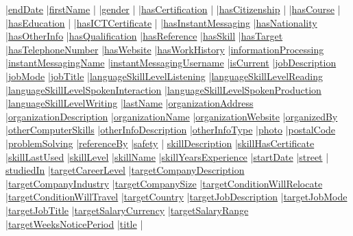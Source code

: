 \documentclass[a4paper,12pt]{article}
\numberwithin{equation}{section}
\begin{document}
|\hyperlink{endDate}{endDate} 
|\hyperlink{firstName}{firstName} |
|\hyperlink{gender}{gender} |
|\hyperlink{hasCertification}{hasCertification} |
|\hyperlink{hasCitizenship}{hasCitizenship} |
|\hyperlink{hasCourse}{hasCourse} |
|\hyperlink{hasEducation}{hasEducation} |
|\hyperlink{hasICTCertificate}{hasICTCertificate} |
|\hyperlink{hasInstantMessaging}{hasInstantMessaging} |\hyperlink{hasNationality}{hasNationality} |\hyperlink{hasOtherInfo}{hasOtherInfo} |\hyperlink{hasQualification}{hasQualification} |\hyperlink{hasReference}{hasReference} |\hyperlink{hasSkill}{hasSkill} |\hyperlink{hasTarget}{hasTarget} |\hyperlink{hasTelephoneNumber}{hasTelephoneNumber} |\hyperlink{hasWebsite}{hasWebsite} |\hyperlink{hasWorkHistory}{hasWorkHistory} |\hyperlink{informationProcessing}{informationProcessing} |\hyperlink{instantMessagingName}{instantMessagingName} |\hyperlink{instantMessagingUsername}{instantMessagingUsername} |\hyperlink{isCurrent}{isCurrent} |\hyperlink{jobDescription}{jobDescription} |\hyperlink{jobMode}{jobMode} |\hyperlink{jobTitle}{jobTitle} |\hyperlink{languageSkillLevelListening}{languageSkillLevelListening} |\hyperlink{languageSkillLevelReading}{languageSkillLevelReading} |\hyperlink{languageSkillLevelSpokenInteraction}{languageSkillLevelSpokenInteraction} |\hyperlink{languageSkillLevelSpokenProduction}{languageSkillLevelSpokenProduction} |\hyperlink{languageSkillLevelWriting}{languageSkillLevelWriting} |\hyperlink{lastName}{lastName} |\hyperlink{organizationAddress}{organizationAddress} |\hyperlink{organizationDescription}{organizationDescription} |\hyperlink{organizationName}{organizationName} |\hyperlink{organizationWebsite}{organizationWebsite} |\hyperlink{organizedBy}{organizedBy} |\hyperlink{otherComputerSkills}{otherComputerSkills} |\hyperlink{otherInfoDescription}{otherInfoDescription} |\hyperlink{otherInfoType}{otherInfoType} |\hyperlink{photo}{photo} |\hyperlink{postalCode}{postalCode} |\hyperlink{problemSolving}{problemSolving} |\hyperlink{referenceBy}{referenceBy} |\hyperlink{safety}{safety} | \hyperlink{skillDescription}{skillDescription} |\hyperlink{skillHasCertificate}{skillHasCertificate} |\hyperlink{skillLastUsed}{skillLastUsed} |\hyperlink{skillLevel}{skillLevel} |\hyperlink{skillName}{skillName} |\hyperlink{skillYearsExperience}{skillYearsExperience} |\hyperlink{startDate}{startDate} |\hyperlink{street}{street} | \hyperlink{studiedIn}{studiedIn} |\hyperlink{targetCareerLevel}{targetCareerLevel} |\hyperlink{targetCompanyDescription}{targetCompanyDescription} |\hyperlink{targetCompanyIndustry}{targetCompanyIndustry} |\hyperlink{targetCompanySize}{targetCompanySize} |\hyperlink{targetConditionWillRelocate}{targetConditionWillRelocate} |\hyperlink{targetConditionWillTravel}{targetConditionWillTravel} |\hyperlink{targetCountry}{targetCountry} |\hyperlink{targetJobDescription}{targetJobDescription} |\hyperlink{targetJobMode}{targetJobMode} |\hyperlink{targetJobTitle}{targetJobTitle} |\hyperlink{targetSalaryCurrency}{targetSalaryCurrency} |\hyperlink{targetSalaryRange}{targetSalaryRange} |\hyperlink{targetWeeksNoticePeriod}{targetWeeksNoticePeriod} |\hyperlink{title}{title} |
\end{document}
